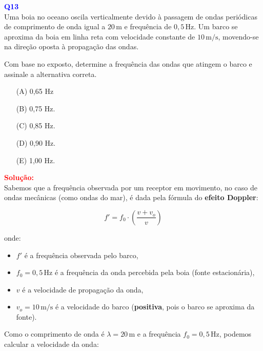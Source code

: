 \documentclass[a4paper,12pt]{article}
\begin{document}
\begin{flushleft}
\textbf{\textcolor{blue}{\Large Q13}}\\
Uma boia no oceano oscila verticalmente devido à passagem de ondas periódicas de comprimento de onda 
igual a \(20\,\text{m}\) e frequência de \(0{,}5\,\text{Hz}\). Um barco se aproxima da boia em linha 
reta com velocidade constante de \(10\,\text{m/s}\), movendo-se na direção oposta à propagação das ondas.

Com base no exposto, determine a frequência das ondas que atingem o barco e assinale a alternativa correta.

\begin{itemize}
\item[(A)] 0,65 Hz 
\item[(B)] 0,75 Hz.
\item[(C)] 0,85 Hz.
\item[(D)] 0,90 Hz.
\item[(E)] 1,00 Hz.
\end{itemize}

\vspace{0.5cm}

\textcolor{red}{\textbf{Solução:}}\\

\noindent
Sabemos que a frequência observada por um receptor em movimento, no caso de \colorbox{yellow!20}{ondas} \colorbox{yellow!20}{mecânicas (como ondas do mar), 
é dada pela fórmula do \textbf{efeito Doppler}:}

\begin{equation}
f' = f_0 \cdot \left( \frac{v + v_o}{v} \right)
\end{equation}

\noindent
onde:
\begin{itemize}
  \item \( f' \) é a frequência observada pelo barco,
  \item \( f_0 = 0{,}5\,\text{Hz} \) é a frequência da onda percebida pela boia (fonte estacionária),
  \item \( v \) é a velocidade de propagação da onda,
  \item \( v_o = 10\,\text{m/s} \) é a velocidade do barco (\textbf{positiva}, pois o barco se aproxima da fonte).
\end{itemize}

\noindent
Como o comprimento de onda é \( \lambda = 20\,\text{m} \) e a frequência \( f_0 = 0{,}5\,\text{Hz} \), podemos calcular a velocidade da onda:


\end{flushleft}
\end{document}
